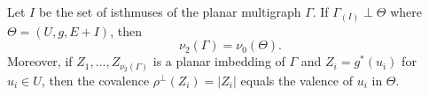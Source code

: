 Let $I$ be the set of isthmuses of the planar multigraph $\Gamma$. If $\Gamma_{(I)} \perp \Theta$ where $\Theta = (U, g, E + I)$, then
$$\nu_2(\Gamma) = \nu_0(\Theta).$$
Moreover, if $Z_1, \ldots, Z_{\nu_2(\Gamma)}$ is a planar imbedding of $\Gamma$ and $Z_i = g^*(u_i)$ for $u_i \in U$, then the covalence $\rho^{\perp}(Z_i) = |Z_i|$ equals the valence of $u_i$ in $\Theta$.
